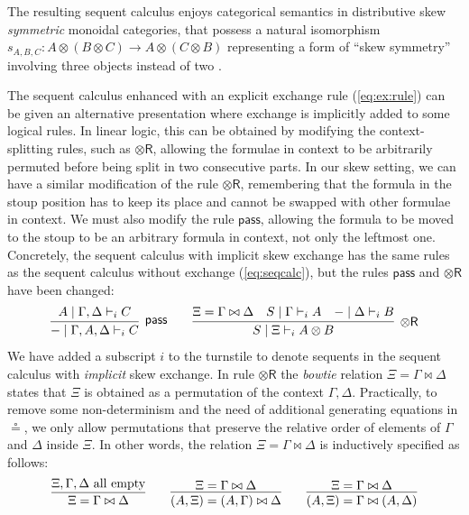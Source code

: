 \documentclass[submission,copyright,creativecommons]{eptcs}
\theoremstyle{definition}
\newcommand{\tr}{\otimes \mathsf{R}}
\newcommand{\pass}{\mathsf{pass}}
\newcommand{\ot}{\otimes}
\begin{document}
The resulting sequent calculus enjoys categorical semantics in distributive skew \emph{symmetric} monoidal categories, that possess a natural isomorphism $s_{A , B , C} : A \ot (B \ot C) \to A \ot (C \ot B)$ representing a form of ``skew symmetry''  involving three objects instead of two \cite{bourke:lack:braided:2020}.

The sequent calculus enhanced with an explicit exchange rule (\ref{eq:ex:rule}) can be given an alternative presentation where exchange is implicitly added to some logical rules.
In linear logic, this can be obtained by modifying the context-splitting rules, such as $\tr$, allowing the formulae in context to be arbitrarily permuted before being split in two consecutive parts.
In our skew setting, we can have a similar modification of the rule $\tr$, remembering that the formula in the stoup position has to keep its place and cannot be swapped with other formulae in context.
We must also modify the rule $\pass$, allowing the formula to be moved to the stoup to be an arbitrary formula in context, not only the leftmost one.
Concretely, the sequent calculus with implicit skew exchange has the same rules as the sequent calculus without exchange (\ref{eq:seqcalc}), but the rules $\pass$ and $\tr$ have been changed:
\begin{equation*}\label{eq:seqcalc:ex}
  \infer[\pass]{{-} \mid \Gamma, A , \Delta \vdash_i C}{
    A \mid \Gamma,\Delta \vdash_i C
  }
    \qquad
    \infer[\tr]{S \mid \Xi \vdash_i A \ot B}{
      \Xi = \Gamma \bowtie \Delta
      &
      S \mid \Gamma \vdash_i A
      &
      {-} \mid \Delta \vdash_i B
    }
\end{equation*}
We have added a subscript $i$ to the turnstile to denote sequents in the sequent calculus with \emph{implicit} skew exchange. 
In rule $\tr$ the \emph{bowtie} relation $\Xi = \Gamma \bowtie \Delta$ states that $\Xi$ is obtained as a permutation of the context $\Gamma,\Delta$.
Practically, to remove some non-determinism and the need of additional generating equations in $\circeq$, we only allow permutations that preserve the relative order of elements of $\Gamma$ and $\Delta$ inside $\Xi$. 
In other words, the relation $\Xi = \Gamma \bowtie \Delta$ is inductively specified as follows:
\begin{equation}\label{eq:ex:impl}
\infer{\Xi = \Gamma \bowtie \Delta}{
  \Xi,\Gamma,\Delta \text{ all empty}
}
\qquad
\infer{(A,\Xi) = (A,\Gamma) \bowtie \Delta}{
  \Xi = \Gamma \bowtie \Delta
}
\qquad
\infer{(A,\Xi) = \Gamma \bowtie (A,\Delta)}{
  \Xi = \Gamma \bowtie \Delta
}
\end{equation}
\end{document}
